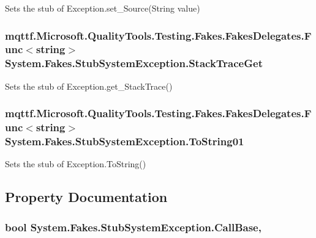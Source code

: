 Sets the stub of Exception.\-set\-\_\-\-Source(\-String value)

\hypertarget{class_system_1_1_fakes_1_1_stub_system_exception_a2002d65be6749b710c50ce1029dd3d68}{
\subsubsection[{Stack\-Trace\-Get}]{\setlength{\rightskip}{0pt plus 5cm}mqttf.\-Microsoft.\-Quality\-Tools.\-Testing.\-Fakes.\-Fakes\-Delegates.\-Func$<$string$>$ System.\-Fakes.\-Stub\-System\-Exception.\-Stack\-Trace\-Get}}\label{class_system_1_1_fakes_1_1_stub_system_exception_a2002d65be6749b710c50ce1029dd3d68}


Sets the stub of Exception.\-get\-\_\-\-Stack\-Trace()

\hypertarget{class_system_1_1_fakes_1_1_stub_system_exception_a3b0d933f69bce8376a8c6c9e9e855757}{
\subsubsection[{To\-String01}]{\setlength{\rightskip}{0pt plus 5cm}mqttf.\-Microsoft.\-Quality\-Tools.\-Testing.\-Fakes.\-Fakes\-Delegates.\-Func$<$string$>$ System.\-Fakes.\-Stub\-System\-Exception.\-To\-String01}}\label{class_system_1_1_fakes_1_1_stub_system_exception_a3b0d933f69bce8376a8c6c9e9e855757}


Sets the stub of Exception.\-To\-String()



\subsection{Property Documentation}
\hypertarget{class_system_1_1_fakes_1_1_stub_system_exception_afbf6c1b523299792625d6bb09f1b3576}{
\subsubsection[{Call\-Base}]{\setlength{\rightskip}{0pt plus 5cm}bool System.\-Fakes.\-Stub\-System\-Exception.\-Call\-Base\hspace{0.3cm}{\ttfamily [get]}, {\ttfamily [set]}}}\label{class_system_1_1_fakes_1_1_stub_system_exception_afbf6c1b523299792625d6bb09f1b3576}


